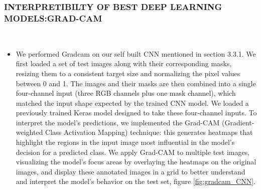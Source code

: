 \documentclass{article}
\begin{document}
\subsubsection{INTERPRETIBILTY OF BEST DEEP LEARNING MODELS:GRAD-CAM}\mbox{}\\
\begin{itemize}
    \item We performed Gradcam on our self built CNN mentioned in section 3.3.1. We first loaded a set of test images along with their corresponding masks, resizing them to a consistent target size and normalizing the pixel values between 0 and 1. The images and their masks are then combined into a single four-channel input (three RGB channels plus one mask channel), which matched the input shape expected by the trained CNN model. We loaded a previously trained Keras model designed to take these four-channel inputs. To interpret the model’s predictions, we implemented the Grad-CAM (Gradient-weighted Class Activation Mapping) technique: this generates heatmaps that highlight the regions in the input image most influential in the model’s decision for a predicted class. We apply Grad-CAM to multiple test images, visualizing the model’s focus areas by overlaying the heatmaps on the original images, and display these annotated images in a grid to better understand and interpret the model’s behavior on the test set, figure \ref{fig:gradcam_CNN}.
\end{itemize}
\end{document}
